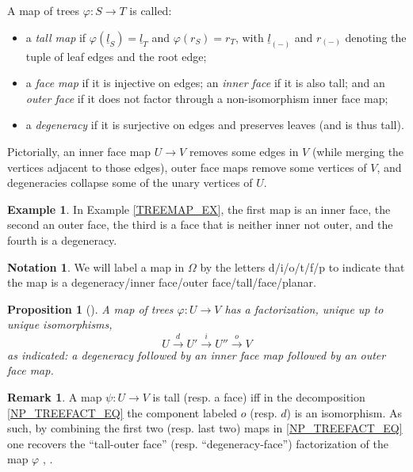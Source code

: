 \documentclass[a4paper,10pt]{article}%
\numberwithin{equation}{section}
\numberwithin{figure}{section}
\newtheorem{proposition}[equation]{Proposition}%
\theoremstyle{definition} %
\newtheorem{example}[equation]{Example}%
\newtheorem{remark}[equation]{Remark}%
\newtheorem{notation}[equation]{Notation}%
\newcommand{\1}{\ensuremath{\mathbbm 1}}%
\begin{document}
A map of trees $\varphi \colon S \to T$ is called:
\begin{itemize}
\item a \textit{tall map} if
      $\varphi(\underline{l}_S) = \underline{l}_T$ and $\varphi(r_S) = r_T$,
      with $\underline{l}_{(-)}$ and $r_{(-)}$ denoting the tuple of leaf edges and the root edge;
\item a \textit{face map} if it is injective on edges;
      an \textit{inner face} if it is also tall; and
      an \textit{outer face} if it does not factor through a non-isomorphism inner face map;
\item a \textit{degeneracy} if it is surjective on edges and preserves leaves
      (and is thus tall).
\end{itemize}

Pictorially, an inner face map 
$U\to V$ removes some edges in $V$
(while merging the vertices adjacent to those edges),
outer face maps remove some vertices of $V$,
and degeneracies collapse some of the unary vertices of $U$.


\begin{example}
      In Example \ref{TREEMAP_EX},
      the first map is an inner face, the second an outer face, the third is a face that is neither inner not outer, and the fourth is a degeneracy.
\end{example}

\begin{notation}
      \label{MAPLABELS_NOT}
      We will label a 
      map in $\Omega$
      by the letters d/i/o/t/f/p
      to indicate that the map is
      a degeneracy/inner face/outer face/tall/face/planar.
\end{notation}

\begin{proposition}[{\cite[Prop. 2.2]{BP_edss}}]
      \label{NP_TREEFACT_PROP}
	A map of trees $\varphi \colon U \to V$ has a factorization, unique up to unique isomorphisms,
        \begin{equation}\label{NP_TREEFACT_EQ}
              U \xrightarrow{d} 
              U' \xrightarrow{i} 
              U'' \xrightarrow{o}
              V
        \end{equation}
        as indicated: a degeneracy followed by an inner face map followed by an outer face map.
\end{proposition}

\begin{remark}\label{TODF REM}
	A map $\psi \colon U \to V$
	is tall (resp. a face)
	iff in the decomposition \eqref{NP_TREEFACT_EQ}
	the component labeled $o$ (resp. $d$) %
	is an isomorphism.
	As such, by combining the 
	first two (resp. last two)
	maps in \eqref{NP_TREEFACT_EQ}
	one recovers the 
	``tall-outer face'' 
	(resp. ``degeneracy-face'')
	factorization of the map $\varphi$
        \cite[Prop. 3.31]{BP_geo}, \cite[Prop. 5.37]{Per18}.
\end{remark}
\end{document}
